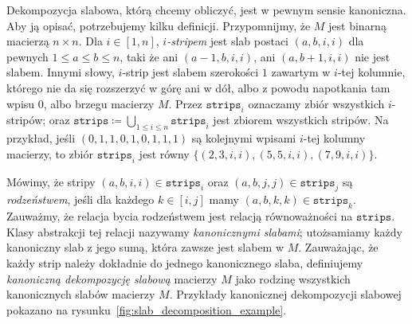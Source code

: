 \documentclass[runningheads]{llncs}
\renewcommand{\leq}{\leqslant}
\begin{document}
\newcommand{\strips}{\mathtt{strips}}

Dekompozycja slabowa, którą chcemy obliczyć, jest w pewnym sensie kanoniczna. Aby ją opisać, potrzebujemy kilku definicji. Przypomnijmy, że $M$ jest binarną macierzą $n\times n$. Dla $i\in [1,n]$, {\em{$i$-stripem}} jest slab postaci $(a,b,i,i)$ dla pewnych $1\leq a\leq b\leq n$, taki że ani $(a-1,b,i,i)$, ani $(a,b+1,i,i)$ nie jest slabem. Innymi słowy, $i$-strip jest slabem szerokości $1$ zawartym w $i$-tej kolumnie, którego nie da się rozszerzyć w górę ani w dół, albo z powodu napotkania tam wpisu $0$, albo brzegu macierzy $M$. 
Przez $\strips_i$ oznaczamy zbiór wszystkich $i$-stripów; oraz $\strips\coloneqq \bigcup_{1\leq i\leq n} \strips_i$ jest zbiorem wszystkich stripów. Na przykład, jeśli $(0, 1, 1, 0, 1, 0, 1, 1, 1)$ są kolejnymi wpisami $i$-tej kolumny macierzy, to zbiór $\strips_i$ jest równy $\{(2,3,i,i), (5,5, i, i), (7,9, i,i)\}$.

Mówimy, że stripy $(a,b,i,i)\in \strips_i$ oraz $(a,b,j,j)\in \strips_j$ są {\em{rodzeństwem}}, jeśli dla każdego $k\in [i,j]$ mamy $(a,b,k,k)\in \strips_k$.
Zauważmy, że relacja bycia rodzeństwem jest relacją równoważności na $\strips$. Klasy abstrakcji tej relacji nazywamy {\em{kanonicznymi slabami}}; utożsamiamy każdy kanoniczny slab z jego sumą, która zawsze jest slabem w $M$. Zauważając, że każdy strip należy dokładnie do jednego kanonicznego slaba, definiujemy {\em{kanoniczną dekompozycję slabową}} macierzy $M$ jako rodzinę wszystkich kanonicznych slabów macierzy $M$. Przykłady kanonicznej dekompozycji slabowej pokazano na rysunku~\ref{fig:slab_decomposition_example}.
\end{document}
